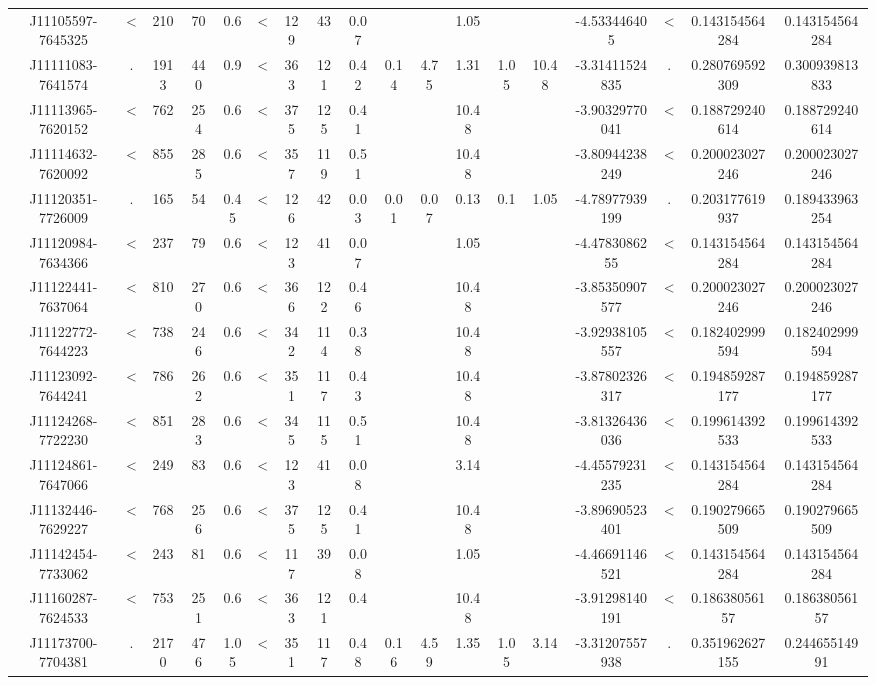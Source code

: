 \begin{table}
\begin{tabular}{cccccccccccccccccc}
J11105597-7645325 & < & 210 & 70 & 0.6 & < & 129 & 43 & 0.07 &  &  & 1.05 &  &  & -4.533446405 & < & 0.143154564284 & 0.143154564284 \\
J11111083-7641574 & . & 1913 & 440 & 0.9 & < & 363 & 121 & 0.42 & 0.14 & 4.75 & 1.31 & 1.05 & 10.48 & -3.31411524835 & . & 0.280769592309 & 0.300939813833 \\
J11113965-7620152 & < & 762 & 254 & 0.6 & < & 375 & 125 & 0.41 &  &  & 10.48 &  &  & -3.90329770041 & < & 0.188729240614 & 0.188729240614 \\
J11114632-7620092 & < & 855 & 285 & 0.6 & < & 357 & 119 & 0.51 &  &  & 10.48 &  &  & -3.80944238249 & < & 0.200023027246 & 0.200023027246 \\
J11120351-7726009 & . & 165 & 54 & 0.45 & < & 126 & 42 & 0.03 & 0.01 & 0.07 & 0.13 & 0.1 & 1.05 & -4.78977939199 & . & 0.203177619937 & 0.189433963254 \\
J11120984-7634366 & < & 237 & 79 & 0.6 & < & 123 & 41 & 0.07 &  &  & 1.05 &  &  & -4.4783086255 & < & 0.143154564284 & 0.143154564284 \\
J11122441-7637064 & < & 810 & 270 & 0.6 & < & 366 & 122 & 0.46 &  &  & 10.48 &  &  & -3.85350907577 & < & 0.200023027246 & 0.200023027246 \\
J11122772-7644223 & < & 738 & 246 & 0.6 & < & 342 & 114 & 0.38 &  &  & 10.48 &  &  & -3.92938105557 & < & 0.182402999594 & 0.182402999594 \\
J11123092-7644241 & < & 786 & 262 & 0.6 & < & 351 & 117 & 0.43 &  &  & 10.48 &  &  & -3.87802326317 & < & 0.194859287177 & 0.194859287177 \\
J11124268-7722230 & < & 851 & 283 & 0.6 & < & 345 & 115 & 0.51 &  &  & 10.48 &  &  & -3.81326436036 & < & 0.199614392533 & 0.199614392533 \\
J11124861-7647066 & < & 249 & 83 & 0.6 & < & 123 & 41 & 0.08 &  &  & 3.14 &  &  & -4.45579231235 & < & 0.143154564284 & 0.143154564284 \\
J11132446-7629227 & < & 768 & 256 & 0.6 & < & 375 & 125 & 0.41 &  &  & 10.48 &  &  & -3.89690523401 & < & 0.190279665509 & 0.190279665509 \\
J11142454-7733062 & < & 243 & 81 & 0.6 & < & 117 & 39 & 0.08 &  &  & 1.05 &  &  & -4.46691146521 & < & 0.143154564284 & 0.143154564284 \\
J11160287-7624533 & < & 753 & 251 & 0.6 & < & 363 & 121 & 0.4 &  &  & 10.48 &  &  & -3.91298140191 & < & 0.18638056157 & 0.18638056157 \\
J11173700-7704381 & . & 2170 & 476 & 1.05 & < & 351 & 117 & 0.48 & 0.16 & 4.59 & 1.35 & 1.05 & 3.14 & -3.31207557938 & . & 0.351962627155 & 0.24465514991 \\

\end{tabular}
\end{table}
